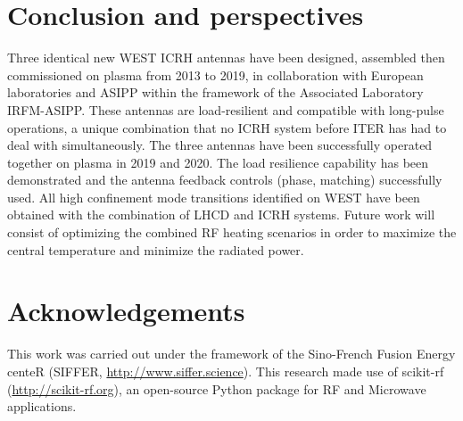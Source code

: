 \documentclass[12p]{iopart}
\begin{document}


\section{Conclusion and perspectives}
Three identical new WEST ICRH antennas have been designed, assembled then commissioned on plasma from 2013 to 2019, in collaboration with European laboratories and ASIPP within the framework of the Associated Laboratory IRFM-ASIPP. These antennas are load-resilient and compatible with long-pulse operations, a unique combination that no ICRH system before ITER has had to deal with simultaneously. The three antennas have been successfully operated together on plasma in 2019 and 2020. The load resilience capability has been demonstrated and the antenna feedback controls (phase, matching) successfully used. All high confinement mode transitions identified on WEST have been obtained with the combination of LHCD and ICRH systems. Future work will consist of optimizing the combined RF heating scenarios in order to maximize the central temperature and minimize the radiated power.

\section*{Acknowledgements}

This work was carried out under the framework of the Sino-French Fusion Energy centeR (SIFFER, \url{http://www.siffer.science}). This research made use of scikit-rf (\url{http://scikit-rf.org}), an open-source Python package for RF and Microwave applications.



\printbibliography
\end{document}
